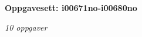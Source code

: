 \centerline{\bf Oppgavesett: i00671no-i00680no}
\vskip 10pt
\centerline{\it 10 oppgaver}\vskip 10pt
\vskip 10pt
